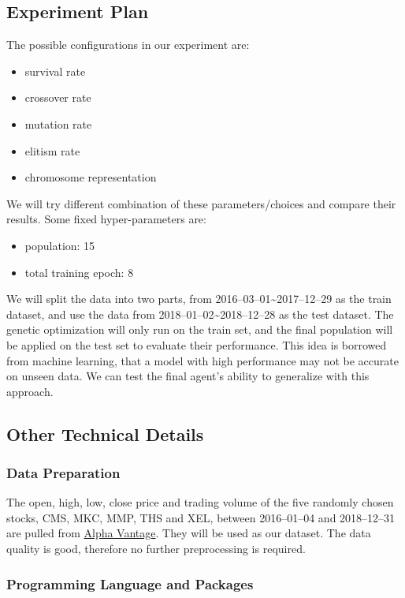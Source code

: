 \documentclass{article}
\begin{document}
\subsection{Experiment Plan}

The possible configurations in our experiment are:
\begin{itemize}
	\item survival rate
	\item crossover rate
	\item mutation rate
	\item elitism rate
	\item chromosome representation
\end{itemize}

We will try different combination of these parameters/choices and compare their results.
Some fixed hyper-parameters are:
\begin{itemize}
	\item population: 15
	\item total training epoch: 8
\end{itemize}

We will split the data into two parts, from 2016--03--01\textasciitilde 2017--12--29 as the train dataset,
and use the data from 2018--01--02\textasciitilde 2018--12--28 as the test dataset.
The genetic optimization will only run on the train set,
and the final population will be applied on the test set to evaluate their performance.
This idea is borrowed from machine learning,
that a model with high performance may not be accurate on unseen data.
We can test the final agent's ability to generalize with this approach.

\subsection{Other Technical Details}

\subsubsection{Data Preparation}

The open, high, low, close price and trading volume
of the five randomly chosen stocks, CMS, MKC, MMP, THS and XEL,
between 2016--01--04 and 2018--12--31 are pulled from \href{https://www.alphavantage.co/}{Alpha Vantage}.
They will be used as our dataset.
The data quality is good, therefore no further preprocessing is required.

\subsubsection{Programming Language and Packages}
\end{document}
